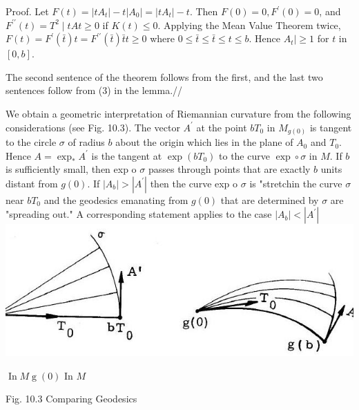 \documentclass[10pt]{article}
\begin{document}
Proof. Let $F(t)=\left|t A_{t}\right|-t\left|A_{0}\right|=\left|t A_{t}\right|-t$. Then $F(0)=0, F^{\prime}(0)=0$, and $F^{\prime \prime}(t)=T^{2} \mid t A t \geq 0$ if $K(t) \leq 0$. Applying the Mean Value Theorem twice, $F(t)=F^{\prime}(\bar{t}) t=F^{\prime \prime}(\bar{t}) \bar{t} t \geq 0$ where $0 \leq \bar{t} \leq \bar{t} \leq t \leq b$. Hence $A_{t} \mid \geq 1$ for $t$ in $[0, b]$.

The second sentence of the theorem follows from the first, and the last two sentences follow from (3) in the lemma.//

We obtain a geometric interpretation of Riemannian curvature from the following considerations (see Fig. 10.3). The vector $A^{\prime}$ at the point $b T_{0}$ in $M_{g(0)}$ is tangent to the circle $\sigma$ of radius $b$ about the origin which lies in the plane of $A_{0}$ and $T_{0} .$ Hence $A=\exp _{*} A^{\prime}$ is the tangent at $\exp \left(b T_{0}\right)$ to the curve $\exp \circ \sigma$ in $M$. If $b$ is sufficiently small, then exp o $\sigma$ passes through points that are exactly $b$ units distant from $g(0)$. If $\left|A_{b}\right|>\left|A^{\prime}\right|$ then the curve exp o $\sigma$ is "stretchin the curve $\sigma$ near $b T_{0}$ and the geodesics emanating from $g(0)$ that are determined by $\sigma$ are "spreading out." A corresponding statement applies to the case $\left|A_{b}\right|<\left|A^{\prime}\right|$\\

\includegraphics[max width=\textwidth]{2022_07_16_f4e476ee2159dc67e746g-82}

$\operatorname{In} M \operatorname{g}(0)$ In $M$

Fig. 10.3 Comparing Geodesics
\end{document}
